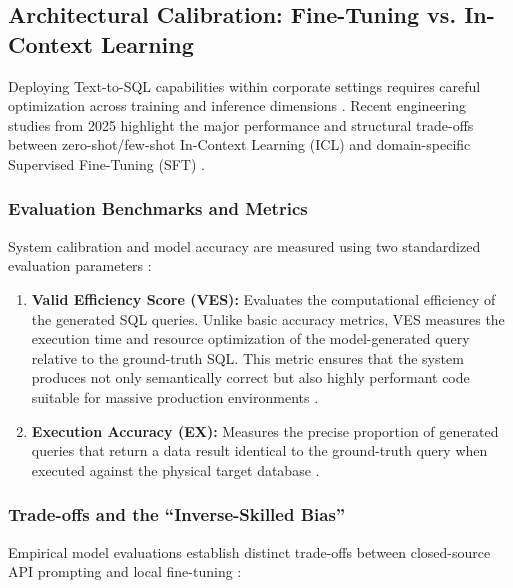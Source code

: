 \subsection{Architectural Calibration: Fine-Tuning vs. In-Context Learning}
Deploying Text-to-SQL capabilities within corporate settings requires careful optimization across training and inference
dimensions \cite{Text_to_SQL_in_the_Era_of_LLMs, Optimizing_text_to_SQL}. Recent engineering studies from 2025 highlight the major
performance and structural trade-offs between zero-shot/few-shot In-Context Learning (ICL) and domain-specific
Supervised Fine-Tuning (SFT) \cite{Text_to_SQL_in_the_Era_of_LLMs, Optimizing_text_to_SQL}.

\subsubsection{Evaluation Benchmarks and Metrics}
System calibration and model accuracy are measured using two standardized evaluation parameters \cite{Text_to_SQL_in_the_Era_of_LLMs,
Optimizing_text_to_SQL}:
\begin{enumerate}
   \item \textbf{Valid Efficiency Score (VES):} Evaluates the computational efficiency of the generated SQL queries. Unlike basic accuracy metrics, VES measures the execution time and resource optimization of the model-generated query relative to the ground-truth SQL. This metric ensures that the system produces not only semantically correct but also highly performant code suitable for massive production environments \cite{Text_to_SQL_in_the_Era_of_LLMs, Optimizing_text_to_SQL}.
   \item \textbf{Execution Accuracy (EX):} Measures the precise proportion of generated queries that return a data result identical to the ground-truth query when executed against the physical target database \cite{Text_to_SQL_in_the_Era_of_LLMs, Optimizing_text_to_SQL}.
\end{enumerate}

\subsubsection{Trade-offs and the ``Inverse-Skilled Bias''}
Empirical model evaluations establish distinct trade-offs between closed-source API prompting and local fine-tuning
\cite{Text_to_SQL_in_the_Era_of_LLMs, Optimizing_text_to_SQL}:

